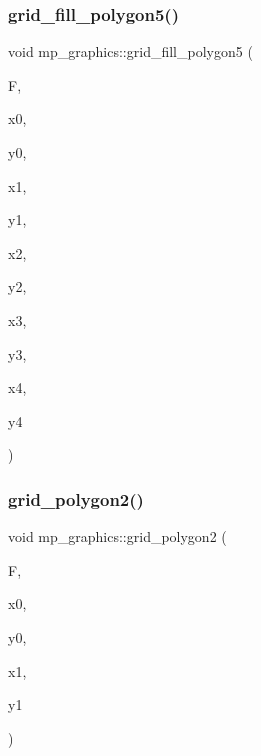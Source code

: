\subsubsection{\texorpdfstring{grid\+\_\+fill\+\_\+polygon5()}{grid\_fill\_polygon5()}}
{\footnotesize\ttfamily void mp\+\_\+graphics\+::grid\+\_\+fill\+\_\+polygon5 (\begin{DoxyParamCaption}\item[{\mbox{\hyperlink{structgrid__frame}{grid\+\_\+frame}} $\ast$}]{F,  }\item[{\mbox{\hyperlink{galois_8h_a09fddde158a3a20bd2dcadb609de11dc}{I\+NT}}}]{x0,  }\item[{\mbox{\hyperlink{galois_8h_a09fddde158a3a20bd2dcadb609de11dc}{I\+NT}}}]{y0,  }\item[{\mbox{\hyperlink{galois_8h_a09fddde158a3a20bd2dcadb609de11dc}{I\+NT}}}]{x1,  }\item[{\mbox{\hyperlink{galois_8h_a09fddde158a3a20bd2dcadb609de11dc}{I\+NT}}}]{y1,  }\item[{\mbox{\hyperlink{galois_8h_a09fddde158a3a20bd2dcadb609de11dc}{I\+NT}}}]{x2,  }\item[{\mbox{\hyperlink{galois_8h_a09fddde158a3a20bd2dcadb609de11dc}{I\+NT}}}]{y2,  }\item[{\mbox{\hyperlink{galois_8h_a09fddde158a3a20bd2dcadb609de11dc}{I\+NT}}}]{x3,  }\item[{\mbox{\hyperlink{galois_8h_a09fddde158a3a20bd2dcadb609de11dc}{I\+NT}}}]{y3,  }\item[{\mbox{\hyperlink{galois_8h_a09fddde158a3a20bd2dcadb609de11dc}{I\+NT}}}]{x4,  }\item[{\mbox{\hyperlink{galois_8h_a09fddde158a3a20bd2dcadb609de11dc}{I\+NT}}}]{y4 }\end{DoxyParamCaption})}

\mbox{\label{classmp__graphics_a2054989685b48955dc50472fe540684b}} 
\subsubsection{\texorpdfstring{grid\+\_\+polygon2()}{grid\_polygon2()}}
{\footnotesize\ttfamily void mp\+\_\+graphics\+::grid\+\_\+polygon2 (\begin{DoxyParamCaption}\item[{\mbox{\hyperlink{structgrid__frame}{grid\+\_\+frame}} $\ast$}]{F,  }\item[{\mbox{\hyperlink{galois_8h_a09fddde158a3a20bd2dcadb609de11dc}{I\+NT}}}]{x0,  }\item[{\mbox{\hyperlink{galois_8h_a09fddde158a3a20bd2dcadb609de11dc}{I\+NT}}}]{y0,  }\item[{\mbox{\hyperlink{galois_8h_a09fddde158a3a20bd2dcadb609de11dc}{I\+NT}}}]{x1,  }\item[{\mbox{\hyperlink{galois_8h_a09fddde158a3a20bd2dcadb609de11dc}{I\+NT}}}]{y1 }\end{DoxyParamCaption})}

